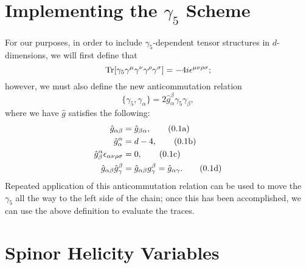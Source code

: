 \documentclass[12pt]{article}
\numberwithin{equation}{section}
\numberwithin{figure}{section}
\numberwithin{table}{section}
\newcommand{\numberthisa}{\addtocounter{equation}{1}\tag{\theequation a}}
\newcommand{\numberthisb}{\addtocounter{equation}{0}\tag{\theequation b}}
\newcommand{\numberthisc}{\addtocounter{equation}{0}\tag{\theequation c}}
\newcommand{\numberthisd}{\addtocounter{equation}{0}\tag{\theequation d}}
\renewcommand{\theequation}{\arabic{section}.\arabic{equation}}
\begin{document}
        \section{Implementing the \(\gamma_5\) Scheme}

        For our purposes, in order to include \(\gamma_5\)-dependent tensor structures in \(d\)-dimensions, we will first define that 
	\begin{equation}
	\Tr[\gamma_5\gamma^\mu\gamma^\nu\gamma^\rho\gamma^\sigma]=-4i\epsilon^{\mu\nu\rho\sigma};
	\end{equation}
        however, we must also define the new anticommutation relation 
	\begin{equation}
	\{\gamma_5,\gamma_\alpha\}=2\hat{g}_\alpha^\beta\gamma_5\gamma_\beta,
	\end{equation}
        where we have \(\hat{g}\) satisfies the following: 
	\begin{align*}
	  \hat{g}_{\alpha\beta} & =\hat{g}_{\beta\alpha}, \numberthisa\\
          \hat{g}_\alpha^\alpha & =d-4, \numberthisb\\
          \hat{g}_{\beta}^\alpha\epsilon_{\alpha\nu\rho\sigma} & =0, \numberthisc\\
          \hat{g}_{\alpha\beta}\hat{g}_\gamma^\beta & =\hat{g}_{\alpha\beta}g_\gamma^\beta=\hat{g}_{\alpha\gamma}. \numberthisd
	\end{align*}
        Repeated application of this anticommutation relation can be used to move the \(\gamma_5\) all the way to the left side of the chain; once this has been accomplished, we can use the above definition to evaluate the traces. 
	
	\section{Spinor Helicity Variables}
	
\end{document}
